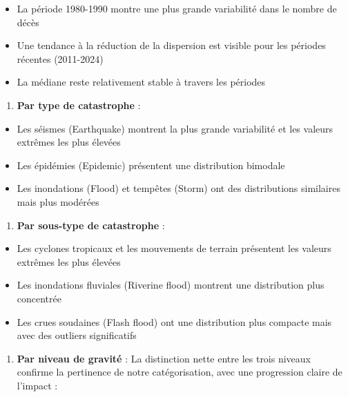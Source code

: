 \documentclass[
]{article}
\providecommand{\tightlist}{%
  \setlength{\itemsep}{0pt}\setlength{\parskip}{0pt}}
\begin{document}
\begin{itemize}
\tightlist
\item
  La période 1980-1990 montre une plus grande variabilité dans le nombre
  de décès
\item
  Une tendance à la réduction de la dispersion est visible pour les
  périodes récentes (2011-2024)
\item
  La médiane reste relativement stable à travers les périodes
\end{itemize}

\begin{enumerate}
\def\labelenumi{\arabic{enumi}.}
\setcounter{enumi}{2}
\tightlist
\item
  \textbf{Par type de catastrophe} :
\end{enumerate}

\begin{itemize}
\tightlist
\item
  Les séismes (Earthquake) montrent la plus grande variabilité et les
  valeurs extrêmes les plus élevées
\item
  Les épidémies (Epidemic) présentent une distribution bimodale
\item
  Les inondations (Flood) et tempêtes (Storm) ont des distributions
  similaires mais plus modérées
\end{itemize}

\begin{enumerate}
\def\labelenumi{\arabic{enumi}.}
\setcounter{enumi}{3}
\tightlist
\item
  \textbf{Par sous-type de catastrophe} :
\end{enumerate}

\begin{itemize}
\tightlist
\item
  Les cyclones tropicaux et les mouvements de terrain présentent les
  valeurs extrêmes les plus élevées
\item
  Les inondations fluviales (Riverine flood) montrent une distribution
  plus concentrée
\item
  Les crues soudaines (Flash flood) ont une distribution plus compacte
  mais avec des outliers significatifs
\end{itemize}

\begin{enumerate}
\def\labelenumi{\arabic{enumi}.}
\setcounter{enumi}{4}
\tightlist
\item
  \textbf{Par niveau de gravité} : La distinction nette entre les trois
  niveaux confirme la pertinence de notre catégorisation, avec une
  progression claire de l'impact :
\end{enumerate}
\end{document}
